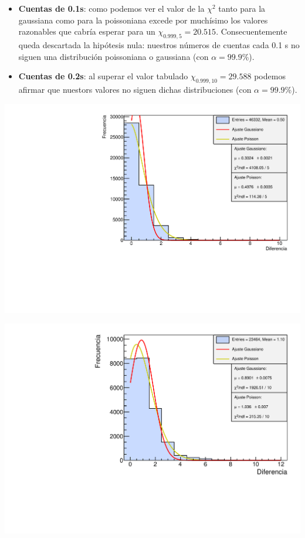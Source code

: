 \documentclass[11pt]{article}
\begin{document}
\begin{itemize}
	\item \textbf{Cuentas de 0.1s}: como podemos ver el valor de la $\chi^2$ tanto para la gaussiana como para la poissoniana excede por muchísimo los valores razonables que cabría esperar para un $\chi_{0.999,5}=20.515$. Consecuentemente queda descartada la hipótesis nula: nuestros números de cuentas cada 0.1 s no siguen una distribución poissoniana o gaussiana (con $\alpha=99.9$\%).
	\item \textbf{Cuentas de 0.2s}: al superar el valor tabulado $\chi_{0.999,10}=29.588$ podemos afirmar que nuestors valores no siguen dichas distribuciones (con $\alpha=99.9$\%).
\end{itemize}
	\begin{minipage}[t]{0.5\linewidth}
		\begin{center}
		\label{Fig:1ms}
		\includegraphics[width=1\linewidth]{../Graficas/Histo_1ms.pdf}
		\end{center}
	\end{minipage}	
	\hfill
	\begin{minipage}[t]{0.5\linewidth}
	\begin{center}
		\label{Fig:2ms}
		\includegraphics[width=1\linewidth]{../Graficas/Histo_2ms.pdf}
	\end{center}
	\end{minipage}	
	
\end{document}

